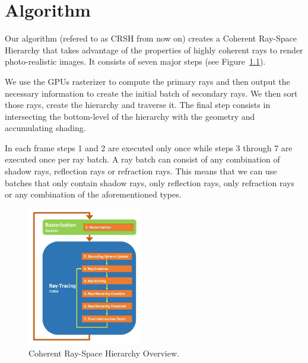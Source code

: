 
\chapter{Algorithm}
\label{chapter:algorithm}

Our algorithm (refered to as CRSH from now on) creates a Coherent Ray-Space Hierarchy that takes advantage of the properties of highly coherent rays to render photo-realistic images.
It consists of seven major steps (see Figure~\ref{fig:crsh}). 

We use the GPUs rasterizer to compute the primary rays and then output the necessary information to create the initial batch of secondary rays. We then sort those rays, create the hierarchy and traverse it. The final step consists in intersecting the bottom-level of the hierarchy with the geometry and accumulating shading.

In each frame steps 1 and 2 are executed only once while steps 3 through 7 are executed once per ray batch. A ray batch can consist of any combination of shadow rays, reflection rays or refraction rays. This means that we can use batches that only contain shadow rays, only reflection rays, only refraction rays or any combination of the aforementioned types.

\begin{figure}[!htb]
    \centering
    \includegraphics[width=0.45\textwidth]{Images/Overview}
    \caption{\label{fig:crsh}Coherent Ray-Space Hierarchy Overview.}
\end{figure}

